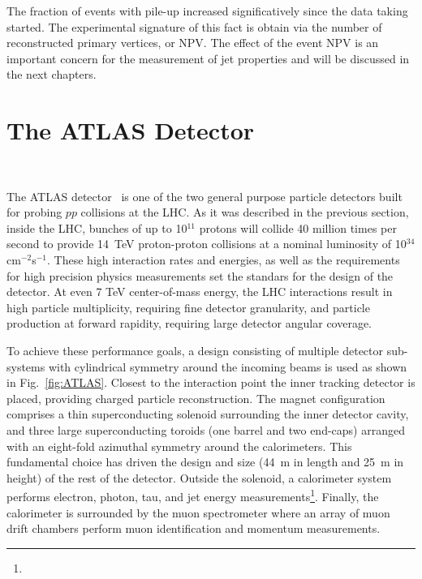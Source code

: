 The fraction of events with pile-up increased significatively since the data taking started. The experimental signature of this fact is obtain via the number of reconstructed primary vertices, or NPV. The effect of the event NPV is an important concern for the measurement of jet properties and will be discussed in the next chapters.


%
%
\section{The ATLAS Detector}~\label{sec:ATLASDetector}


The ATLAS detector~\cite{ATLAS} is one of the two general purpose particle detectors built for probing $pp$ collisions at the LHC. As it was described in the previous section, inside the LHC, bunches of up to 10$^{11}$ protons will collide 40 million times per second to provide 14~TeV proton-proton collisions at a nominal luminosity of 10$^{34}$cm$^{-2}$s$^{-1}$. These high interaction rates and energies, as well as the requirements for high precision physics measurements set the standars for the design of the detector. At even 7 TeV center-of-mass energy, the LHC interactions result in high particle multiplicity, requiring fine detector granularity, and particle production at forward rapidity, requiring large detector angular coverage.

To achieve these performance goals, a design consisting of multiple detector sub-systems with cylindrical symmetry around the incoming beams is used as shown in Fig.~\ref{fig:ATLAS}. Closest to the interaction point the inner tracking detector is placed, providing charged particle reconstruction. The magnet configuration comprises a thin superconducting solenoid surrounding the inner detector cavity, and three large superconducting toroids (one barrel and two end-caps) arranged with an eight-fold azimuthal symmetry around the calorimeters. This fundamental choice has driven the design and size (44~m in length and 25~m in height) of the rest of the detector. Outside the solenoid, a calorimeter system performs electron, photon, tau, and jet energy measurements\footnote{}. Finally, the calorimeter is surrounded by the muon spectrometer where an array of muon drift chambers perform muon identification and momentum measurements.

